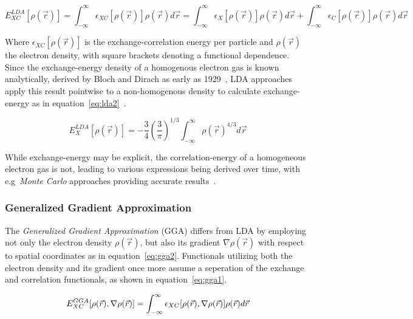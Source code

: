 \documentclass[12pt]{article}
\begin{document}
\begin{equation}
  E_{XC}^{LDA}[\rho(\vec{r})] = \int_{-\infty}^{\infty} \epsilon_{XC}[\rho(\vec{r})]\rho(\vec{r})d\vec{r} = \int_{-\infty}^{\infty} \epsilon_{X}[\rho(\vec{r})]\rho(\vec{r})d\vec{r} + \int_{-\infty}^{\infty} \epsilon_{C}[\rho(\vec{r})]\rho(\vec{r})d\vec{r}
  \label{eq:lda}
\end{equation}

\bigskip

\noindent Where $\epsilon_{XC}[\rho(\vec{r})]$ is the exchange-correlation energy per particle and $\rho(\vec{r})$ the electron density, with square brackets denoting a functional dependence.
Since the exchange-energy density of a homogenous electron gas is known analytically, derived by Bloch and Dirach as early as 1929~\cite{Bloch1929}\cite{Dirac1930}, LDA approaches apply this result pointwise to a non-homogenous density to calculate exchange-energy as in equation~\ref{eq:lda2}~\cite{parr1994density}.

\begin{equation}
  E_X^{LDA}[\rho(\vec{r})] = -\frac{3}{4}\left(\frac{3}{\pi}\right)^{1/3}\int_{-\infty}^{\infty}\rho(\vec{r})^{4/3}d\vec{r}
  \label{eq:lda2}
\end{equation}

\bigskip

\noindent While exchange-energy may be explicit, the correlation-energy of a homogeneous electron gas is not, leading to various expressions being derived over time, with e.g~\textit{Monte Carlo} approaches providing accurate results~\cite{Ceperley1980}.

\subsubsection{Generalized Gradient Approximation}
The \textit{Generalized Gradient Approximation} (GGA) differs from LDA by employing not only the electron density $\rho(\vec{r})$, but also its gradient $\nabla\rho(\vec{r})$ with respect to spatial coordinates as in equation~\ref{eq:gga2}.
Functionals utilizing both the electron density and its gradient once more assume a seperation of the exchange and correlation functionals, as shown in equation~\ref{eq:gga1}.

\begin{equation}
  E_{XC}^{GGA}[\rho(\vec{r}), \nabla\rho(\vec{r})] = \int_{-\infty}^{\infty} \epsilon_{XC}[\rho(\vec{r}), \nabla\rho(\vec{r})]\rho(\vec{r})d\vec{r} \\
\label{eq:gga2}
\end{equation}
\end{document}
